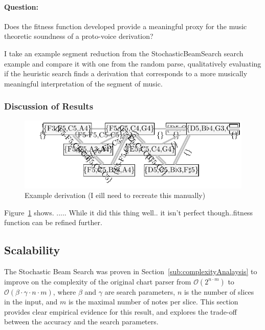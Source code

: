 \documentclass[12pt,a4paper,twoside,openany]{report} \usepackage[pdfborder={0 0 0}]{hyperref}    %
\theoremstyle{definition} \newtheorem{definition}{Definition}[section]
\begin{document}
  \paragraph{Question:} {Does the fitness function developed provide a meaningful proxy for the music theoretic
  soundness of a proto-voice derivation?}

  I take an example segment reduction from the StochasticBeamSearch search example and compare it with one from the
  random parse, qualitatively evaluating if the heuristic search finds a derivation that corresponds to a more
  musically meaningful interpretation of the segment of music.

  \subsubsection{Discussion of Results}
  \begin{figure}[ht]
    \begin{center}
      \includegraphics[width=\textwidth]{figs/eval/Extension/derivation.pdf}
    \end{center}
    \caption{Example derivation (I eill need to recreate this manually)}
    \label{fig:extDeriv}
  \end{figure}

  Figure~\ref{fig:extDeriv} shows. ..... While it did this thing well.. it isn't perfect though..fitness
  function can be refined further.

  \subsection{Scalability}
  \label{sub:evalExtScale}
  The Stochastic Beam Search was proven in Section~\ref{sub:complexityAnalaysis} to improve on the complexity of the
  original chart parser from $\mathcal{O}(2^{n \cdot m})$ to $\mathcal{O}(\beta \cdot \gamma \cdot n \cdot m)$, where
  $\beta$ and $\gamma$ are search parameters, $n$ is the number of slices in the input, and $m$ is the maximal number
  of notes per slice. This section provides clear empirical evidence for this result, and explores the trade-off between
  the accuracy and the search parameters.
\end{document}
